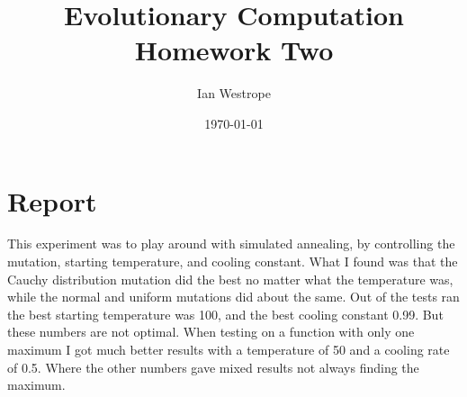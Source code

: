 \documentclass[12pt]{article}
\author{Ian Westrope}
\title{Evolutionary Computation Homework Two}
\date{\today}
\begin{document}
\maketitle

\section{Report}
This experiment was to play around with simulated annealing, by controlling the mutation, starting temperature, and cooling constant. What I found was that the Cauchy distribution mutation did the best no matter what the temperature was, while the normal and uniform mutations did about the same. Out of the tests ran the best starting temperature was 100, and the best cooling constant 0.99. But these numbers are not optimal. When testing on a function with only one maximum I got much better results with a temperature of 50 and a cooling rate of 0.5. Where the other numbers gave mixed results not always finding the maximum. 
\end{document}
